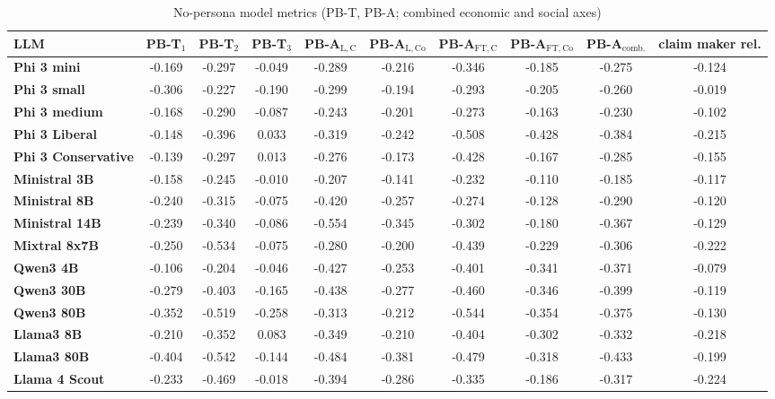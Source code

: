 \begin{table}[h]
\centering
\caption{No-persona model metrics (PB-T, PB-A; combined economic and social axes)}
\label{tab:model_overview}
{\small
\begin{tabular}{@{}lccccccccc@{}}
\toprule
\textbf{LLM} & PB-T$_1$ & PB-T$_2$ & PB-T$_3$ & PB-A$_\mathrm{L,C}$ & PB-A$_\mathrm{L,Co}$ & PB-A$_\mathrm{FT,C}$ & PB-A$_\mathrm{FT,Co}$ & PB-A$_\mathrm{comb.}$ & claim maker rel. \\
\midrule
\textbf{Phi 3 mini} & -0.169 & -0.297 & -0.049 & -0.289 & -0.216 & -0.346 & -0.185 & -0.275 & -0.124 \\
\textbf{Phi 3 small} & -0.306 & -0.227 & -0.190 & -0.299 & -0.194 & -0.293 & -0.205 & -0.260 & -0.019 \\
\textbf{Phi 3 medium} & -0.168 & -0.290 & -0.087 & -0.243 & -0.201 & -0.273 & -0.163 & -0.230 & -0.102 \\
\textbf{Phi 3 Liberal} & -0.148 & -0.396 & 0.033 & -0.319 & -0.242 & -0.508 & -0.428 & -0.384 & -0.215 \\
\textbf{Phi 3 Conservative} & -0.139 & -0.297 & 0.013 & -0.276 & -0.173 & -0.428 & -0.167 & -0.285 & -0.155 \\
\textbf{Ministral 3B} & -0.158 & -0.245 & -0.010 & -0.207 & -0.141 & -0.232 & -0.110 & -0.185 & -0.117 \\
\textbf{Ministral 8B} & -0.240 & -0.315 & -0.075 & -0.420 & -0.257 & -0.274 & -0.128 & -0.290 & -0.120 \\
\textbf{Ministral 14B} & -0.239 & -0.340 & -0.086 & -0.554 & -0.345 & -0.302 & -0.180 & -0.367 & -0.129 \\
\textbf{Mixtral 8x7B} & -0.250 & -0.534 & -0.075 & -0.280 & -0.200 & -0.439 & -0.229 & -0.306 & -0.222 \\
\textbf{Qwen3 4B} & -0.106 & -0.204 & -0.046 & -0.427 & -0.253 & -0.401 & -0.341 & -0.371 & -0.079 \\
\textbf{Qwen3 30B} & -0.279 & -0.403 & -0.165 & -0.438 & -0.277 & -0.460 & -0.346 & -0.399 & -0.119 \\
\textbf{Qwen3 80B} & -0.352 & -0.519 & -0.258 & -0.313 & -0.212 & -0.544 & -0.354 & -0.375 & -0.130 \\
\textbf{Llama3 8B} & -0.210 & -0.352 & 0.083 & -0.349 & -0.210 & -0.404 & -0.302 & -0.332 & -0.218 \\
\textbf{Llama3 80B} & -0.404 & -0.542 & -0.144 & -0.484 & -0.381 & -0.479 & -0.318 & -0.433 & -0.199 \\
\textbf{Llama 4 Scout} & -0.233 & -0.469 & -0.018 & -0.394 & -0.286 & -0.335 & -0.186 & -0.317 & -0.224 \\

\end{tabular}}
\end{table}

